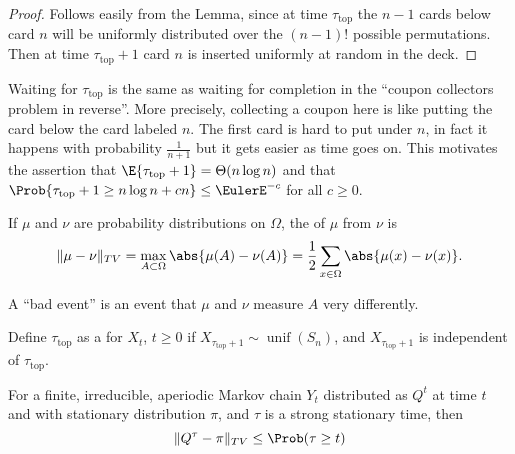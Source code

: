 \documentclass[12pt]{article}
\begin{document}
\begin{proof}
    Follows easily from the Lemma, since at time \( \tau_{\text{top}} \)
    the \( n-1 \) cards below card \( n \) will be uniformly distributed
    over the \( (n-1)! \) possible permutations.  Then at time \( \tau_{\text
    {top}}+ 1 \) card \( n \) is inserted uniformly at random in the
    deck.
\end{proof}

\begin{remark}
    Waiting for \( \tau_{\text{top}} \) is the same as waiting for
    completion in the ``coupon collectors problem in reverse''.  More
    precisely, collecting a coupon here is like putting the card below
    the card labeled \( n \).  The first card is hard to put under \( n \),
    in fact it happens with probability \( \frac{1}{n+1} \) but it gets
    easier as time goes on.  This motivates the assertion that \( \E{\tau_
    {\text{top}} + 1} = \Theta(n \log n) \) and that \( \Prob{\tau_{\text
    {top}}+1 \ge n \log n + c n} \le \EulerE^{-c} \) for all \( c \ge 0 \).
\end{remark}

\begin{definition}
    If \( \mu \) and \( \nu \) are probability distributions on \(
    \Omega \), the  of \( \mu \) from \(
    \nu \) is%
    \[
        \| \mu - \nu \|_{TV} = \max_{A \subset \Omega} \abs{ \mu(A) -
        \nu(A)} = \frac{1}{2} \sum\limits_{x \in \Omega} \abs{ \mu(x) -
        \nu(x)}.
    \]
\end{definition}

\begin{remark}
    A ``bad event'' is an event that \( \mu \) and \( \nu \) measure \(
    A \) very differently.
\end{remark}

\begin{definition}
    Define \( \tau_{\text{top}} \) as a %
    for \( X_t \), \( t \ge 0 \) if \( X_{\tau_{\text{top}}+1} \sim
    \operatorname{unif}
    (S_n) \), and \( X_{\tau_{\text{top}}+1} \) is independent of \(
    \tau_{\text{top}} \).
\end{definition}

\begin{theorem}
    For a finite, irreducible, aperiodic Markov chain \( Y_t \)
    distributed as \( Q^t \) at time \( t \) and with stationary
    distribution \( \pi \), and \( \tau \) is a strong stationary time,
    then
    \[
        \| Q^{\tau} - \pi \|_{TV} \le \Prob(\tau \ge t)
    \]
\end{theorem}
\end{document}
